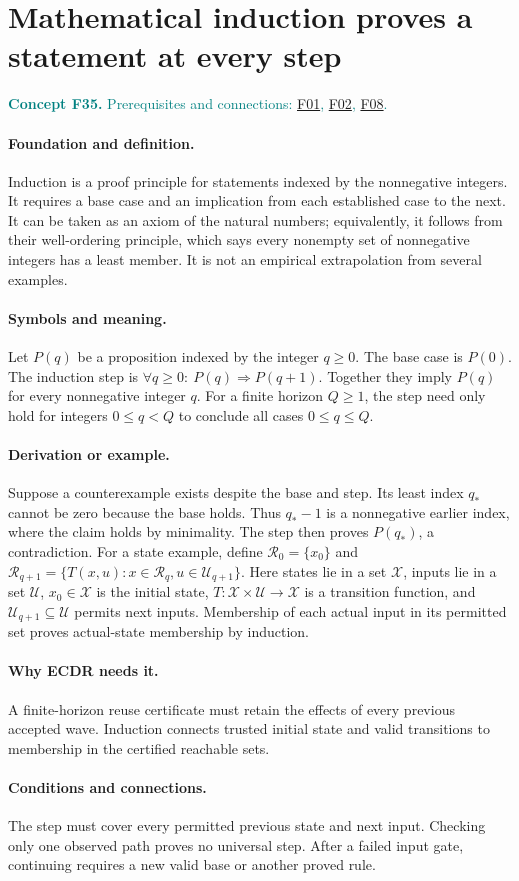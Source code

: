 \documentclass[11pt,a4paper]{article}
\newcommand{\conceptid}{Front matter}
\newcommand{\concept}[3]{\clearpage\renewcommand{\conceptid}{#1}%
\section{#2}\label{concept:#1}%
\textcolor{teal}{\textbf{Concept #1.} Prerequisites and connections: #3.}\par
\typeout{ECDR-CONCEPT-START #1 PAGE=\thepage}}
\begin{document}
\concept{F35}{Mathematical induction proves a statement at every step}{\hyperref[concept:F01]{F01}, \hyperref[concept:F02]{F02}, \hyperref[concept:F08]{F08}}
\paragraph{Foundation and definition.}
Induction is a proof principle for statements indexed by the
nonnegative integers. It requires a base case and an implication from
each established case to the next. It can be taken as an axiom of the
natural numbers; equivalently, it follows from their well-ordering
principle, which says every nonempty set of nonnegative integers has a
least member. It is not an empirical extrapolation from several examples.
\paragraph{Symbols and meaning.}
Let $P(q)$ be a proposition indexed by the integer $q\ge0$. The base
case is $P(0)$. The induction step is
$\forall q\ge0:\ P(q)\Rightarrow P(q+1)$. Together they imply
$P(q)$ for every nonnegative integer $q$. For a finite horizon
$Q\ge1$, the step need only hold for integers $0\le q<Q$ to conclude
all cases $0\le q\le Q$.
\paragraph{Derivation or example.}
Suppose a counterexample exists despite the base and step. Its least
index $q_*$ cannot be zero because the base holds. Thus $q_*-1$ is a
nonnegative earlier index, where the claim holds by minimality. The step
then proves $P(q_*)$, a contradiction. For a state example, define
$\mathcal R_0=\{x_0\}$ and
$\mathcal R_{q+1}=\{T(x,u):x\in\mathcal R_q,u\in\mathcal U_{q+1}\}$.
Here states lie in a set $\mathcal X$, inputs lie in a set
$\mathcal U$, $x_0\in\mathcal X$ is the initial state,
$T:\mathcal X\times\mathcal U\to\mathcal X$ is a transition function,
and $\mathcal U_{q+1}\subseteq\mathcal U$ permits next inputs. Membership of each
actual input in its permitted set proves actual-state membership by
induction.
\paragraph{Why ECDR needs it.}
A finite-horizon reuse certificate must retain the effects of every
previous accepted wave. Induction connects trusted initial state and
valid transitions to membership in the certified reachable sets.
\paragraph{Conditions and connections.}
The step must cover every permitted previous state and next input.
Checking only one observed path proves no universal step. After a failed
input gate, continuing requires a new valid base or another proved rule.
\par\label{endconcept:F35}
\end{document}

